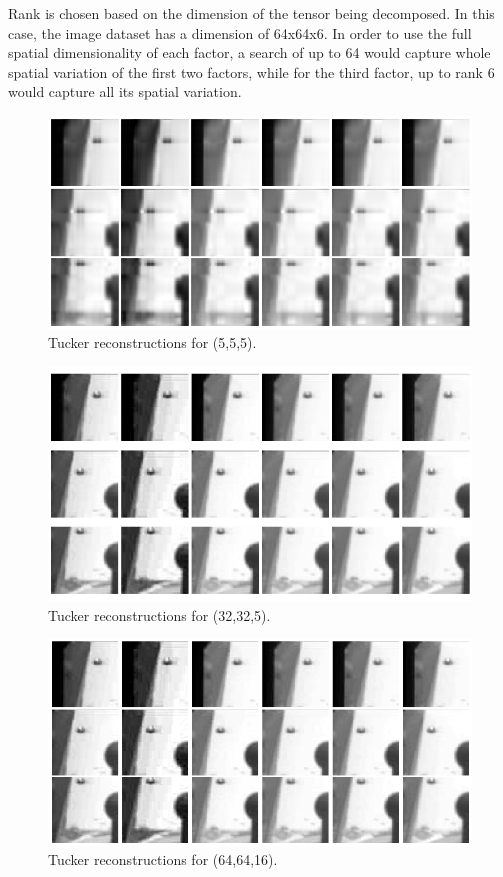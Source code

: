 \documentclass[pdflatex,sn-mathphys-ay]{sn-jnl}
\begin{document}
Rank is chosen based on the dimension of the tensor being decomposed. In this case, the image dataset has a dimension of 64x64x6. In order to use the full spatial dimensionality of each factor, a search of up to 64 would capture whole spatial variation of the first two factors, while for the third factor, up to rank 6 would capture all its spatial variation.

\begin{figure}
  \centering
  \includegraphics[width=\linewidth]{Tucker rank 5 5 5.png}
  \caption{Tucker reconstructions for (5,5,5).}
  \label{fig:tucker-rank-visuals1}
\end{figure}

\begin{figure}
  \centering
  \includegraphics[width=\linewidth]{Tucker rank 32 32 5.png}
  \caption{Tucker reconstructions for (32,32,5).}
  \label{fig:tucker-rank-visuals2}
\end{figure}

\begin{figure}
  \centering
  \includegraphics[width=\linewidth]{Tucker rank 64 64 16.png}
  \caption{Tucker reconstructions for (64,64,16).}
  \label{fig:tucker-rank-visuals3}
\end{figure}
\end{document}
